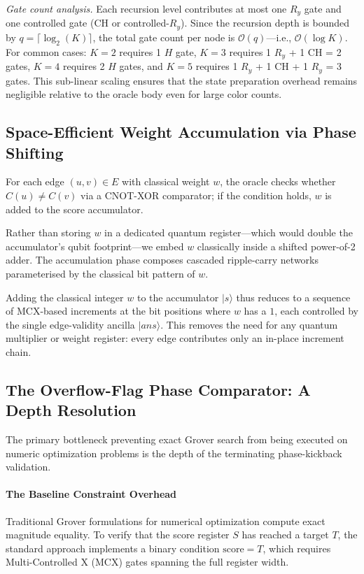 \documentclass{ieeeaccess}
\begin{document}
\textit{Gate count analysis.} Each recursion level contributes at most one $R_y$ gate and one controlled gate (CH or controlled-$R_y$). Since the recursion depth is bounded by $q = \lceil \log_2(K) \rceil$, the total gate count per node is $\mathcal{O}(q)$---i.e., $\mathcal{O}(\log K)$. For common cases: $K=2$ requires 1 $H$ gate, $K=3$ requires 1 $R_y$ + 1 CH = 2 gates, $K=4$ requires 2 $H$ gates, and $K=5$ requires 1 $R_y$ + 1 CH + 1 $R_y$ = 3 gates. This sub-linear scaling ensures that the state preparation overhead remains negligible relative to the oracle body even for large color counts.

\subsection{Space-Efficient Weight Accumulation via Phase Shifting}
For each edge $(u,v) \in E$ with classical weight $w$, the oracle checks whether $C(u) \ne C(v)$ via a CNOT-XOR comparator; if the condition holds, $w$ is added to the score accumulator.

Rather than storing $w$ in a dedicated quantum register---which would double the accumulator's qubit footprint---we embed $w$ classically inside a shifted power-of-2 adder. The accumulation phase composes cascaded ripple-carry networks~\cite{nielsen2010} parameterised by the classical bit pattern of $w$.

Adding the classical integer $w$ to the accumulator $|s\rangle$ thus reduces to a sequence of MCX-based increments at the bit positions where $w$ has a $1$, each controlled by the single edge-validity ancilla $|ans\rangle$. This removes the need for any quantum multiplier or weight register: every edge contributes only an in-place increment chain.

\subsection{The Overflow-Flag Phase Comparator: A Depth Resolution}
The primary bottleneck preventing exact Grover search from being executed on numeric optimization problems is the depth of the terminating phase-kickback validation.

\paragraph{The Baseline Constraint Overhead}
Traditional Grover formulations for numerical optimization compute exact magnitude equality. To verify that the score register $S$ has reached a target $T$, the standard approach implements a binary condition $\text{score} = T$, which requires Multi-Controlled X (MCX) gates spanning the full register width.
\end{document}
